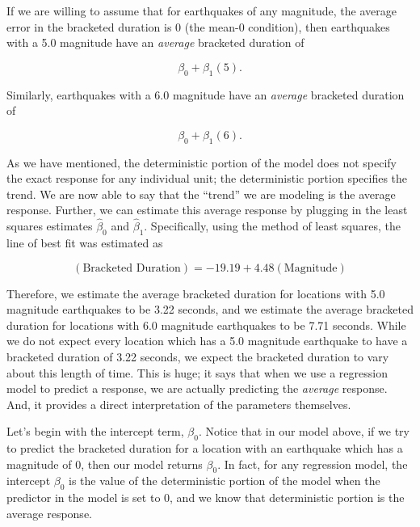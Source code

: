 \documentclass[
  letterpaper,
  DIV=11,
  numbers=noendperiod]{scrreprt}
\theoremstyle{definition}
\theoremstyle{definition}
\theoremstyle{plain}
\theoremstyle{remark}
\begin{document}
If we are willing to assume that for earthquakes of any magnitude, the
average error in the bracketed duration is 0 (the mean-0 condition),
then earthquakes with a 5.0 magnitude have an \emph{average} bracketed
duration of

\[\beta_0 + \beta_1(5).\]

Similarly, earthquakes with a 6.0 magnitude have an \emph{average}
bracketed duration of

\[\beta_0 + \beta_1(6).\]

As we have mentioned, the deterministic portion of the model does not
specify the exact response for any individual unit; the deterministic
portion specifies the trend. We are now able to say that the ``trend''
we are modeling is the average response. Further, we can estimate this
average response by plugging in the least squares estimates
\(\widehat{\beta}_0\) and \(\widehat{\beta}_1\). Specifically, using the
method of least squares, the line of best fit was estimated as

\[(\text{Bracketed Duration}) = -19.19 + 4.48 (\text{Magnitude})\]

Therefore, we estimate the average bracketed duration for locations with
5.0 magnitude earthquakes to be 3.22 seconds, and we estimate the
average bracketed duration for locations with 6.0 magnitude earthquakes
to be 7.71 seconds. While we do not expect every location which has a
5.0 magnitude earthquake to have a bracketed duration of 3.22 seconds,
we expect the bracketed duration to vary about this length of time. This
is huge; it says that when we use a regression model to predict a
response, we are actually predicting the \emph{average} response. And,
it provides a direct interpretation of the parameters themselves.

Let's begin with the intercept term, \(\beta_0\). Notice that in our
model above, if we try to predict the bracketed duration for a location
with an earthquake which has a magnitude of 0, then our model returns
\(\beta_0\). In fact, for any regression model, the intercept
\(\beta_0\) is the value of the deterministic portion of the model when
the predictor in the model is set to 0, and we know that deterministic
portion is the average response.
\end{document}
